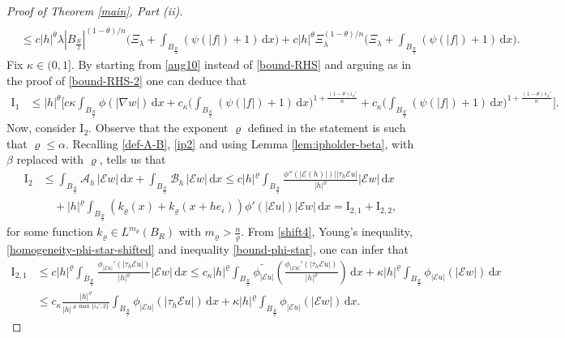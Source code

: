 \documentclass[leqno,11pt]{amsart}%
\numberwithin{equation}{section}
\def\d{\mathrm{d}}
\def\E{\mathcal{E}}
\def\dx{\d x}
\theoremstyle{definition}
\numberwithin{equation}{section}
\begin{document}
\begin{proof}[Proof of Theorem \ref{main}, Part (ii)]
\begin{align}
\\  \nonumber & \leq 
c|h|^{\theta}\lambda|B_{\frac R2}|^{({1-\theta})/n}\bigg(\Xi_\lambda +\int_{B_{\frac R2}}(\psi(|f|)+1)\,\dx\bigg)
  + c|h|^{\theta}\Xi_\lambda^{({1-\theta})/n}\bigg(\Xi_\lambda +\int_{B_{\frac R2}}(\psi(|f|)+1)\,\dx\bigg).
\end{align}
Fix $\kappa \in (0,1]$. By starting from \eqref{aug10} instead of \eqref{bound-RHS} and arguing as in the proof of \eqref{bound-RHS-2} one can deduce that
\begin{align}
   \mathrm{I}_1
  &\le
     |h|^{\theta}\Bigg[ c\kappa\int_{B_{\frac R2}}\phi(|\nabla w|)\,\dx
   +
   c_\kappa\bigg(\int_{B_{\frac R2}}(\psi(|f|)+1)\,\dx\bigg)^{1+\frac{({1-\theta}) i_\phi'}{n}}
   +
   c_\kappa\bigg(\int_{B_{\frac R2}}(\psi(|f|)+1)\,\dx\bigg)^{1+\frac{({1-\theta}) s_\phi'}{n}}\Bigg].
 \end{align}
 Now, consider $\mathrm{I}_2$. Observe that the exponent $\varrho$ defined in the statement
is such that
$\varrho \leq \alpha$.
 Recalling \eqref{def-A-B}, \eqref{ip2} and using {Lemma \ref{lem:ipholder-beta}}, with $\beta$ replaced with $\varrho$,  tells us that
\begin{align}\label{aug14}
    \mathrm{I}_2&\le  \int_{B_{\frac R2}}
  \mathcal{A}_h\,|\E w| \,\dx+\int_{B_{\frac R2}}
  \mathcal{B}_h\,|\E w| \,\dx
  \le  c |h|^{\varrho} \int_{B_{\frac R2}} \frac{\phi''(|\E(h)|)||\tau_h\E u|}{|h|^{\varrho}}|\E w|\,\dx \\ \nonumber
& \quad +|h|^\varrho\int_{B_{\frac R2}}({k_\varrho(x)+k_\varrho(x+he_i)})\phi'(|\E u|)|\E w|\,\dx =\mathrm{I}_{2,1}+\mathrm{I}_{2,2},
\end{align}
{for some function $k_\varrho\in L^{m_\varrho}(B_R)$ with ${m_\varrho}>\frac{n}{\varrho}$.}
From \eqref{shift4}, Young's inequality, \eqref{homogeneity-phi-star-shifted} and inequality \eqref{bound-phi-star}, one can infer that
\begin{align*}
    \mathrm{I_{2,1}}&\le   c{|h|^{\varrho}}\int_{B_{\frac R2}}\frac{\phi_{|\E u|}'(|\tau_h\E u|)}{|h|^{\varrho}}\left|\E w\right|\,\dx
 \le c_\kappa{|h|^{\varrho}}\int_{B_{\frac R2}}\widetilde{\phi_{|\E u|}}\left(\frac{\phi_{|\E u|}'(|\tau_h\E u|)}{|h|^\varrho}\right)\,\dx+\kappa{|h|^{\varrho}}\int_{B_{\frac R2}}\phi_{|\E u|}\left(|\E w|\right)\,\dx
\\ \nonumber
    &\le c_\kappa \frac{{|h|^{\varrho}}}{|h|^{\varrho\max\{i_\phi',2\}}}\int_{B_{\frac R2}}\phi_{|\E u|}(|\tau_h\E u|)\,\dx+\kappa{|h|^{\varrho}}\int_{B_{\frac R2}}\phi_{|\E u|}(|\E w|)\,\dx.
\end{align*}

\end{proof}
\end{document}
